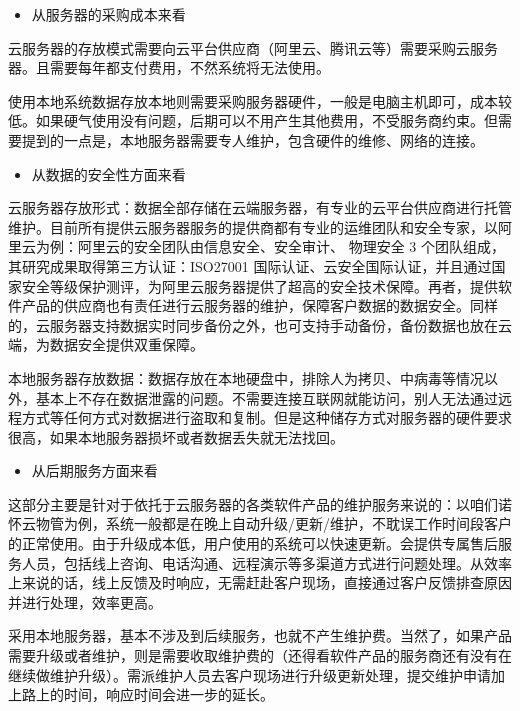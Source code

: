 \documentclass[UTF8,a4paper,AutoFakeBold,AutoFakeSlant]{ctexart}
\begin{document}
\begin{itemize}
  \item 从服务器的采购成本来看
\end{itemize}

云服务器的存放模式需要向云平台供应商（阿里云、腾讯云等）需要采购云服务器。且需要每年都支付费用，不然系统将无法使用。

使用本地系统数据存放本地则需要采购服务器硬件，一般是电脑主机即可，成本较低。如果硬气使用没有问题，后期可以不用产生其他费用，不受服务商约束。但需要提到的一点是，本地服务器需要专人维护，包含硬件的维修、网络的连接。

\begin{itemize}
  \item 从数据的安全性方面来看
\end{itemize}


云服务器存放形式：数据全部存储在云端服务器，有专业的云平台供应商进行托管维护。目前所有提供云服务器服务的提供商都有专业的运维团队和安全专家，以阿里云为例：阿里云的安全团队由信息安全、安全审计、 物理安全 3 个团队组成，其研究成果取得第三方认证：ISO27001 国际认证、云安全国际认证，并且通过国家安全等级保护测评，为阿里云服务器提供了超高的安全技术保障。再者，提供软件产品的供应商也有责任进行云服务器的维护，保障客户数据的数据安全。同样的，云服务器支持数据实时同步备份之外，也可支持手动备份，备份数据也放在云端，为数据安全提供双重保障。

本地服务器存放数据：数据存放在本地硬盘中，排除人为拷贝、中病毒等情况以外，基本上不存在数据泄露的问题。不需要连接互联网就能访问，别人无法通过远程方式等任何方式对数据进行盗取和复制。但是这种储存方式对服务器的硬件要求很高，如果本地服务器损坏或者数据丢失就无法找回。

\begin{itemize}
  \item 从后期服务方面来看
\end{itemize}

这部分主要是针对于依托于云服务器的各类软件产品的维护服务来说的：以咱们诺怀云物管为例，系统一般都是在晚上自动升级/更新/维护，不耽误工作时间段客户的正常使用。由于升级成本低，用户使用的系统可以快速更新。会提供专属售后服务人员，包括线上咨询、电话沟通、远程演示等多渠道方式进行问题处理。从效率上来说的话，线上反馈及时响应，无需赶赴客户现场，直接通过客户反馈排查原因并进行处理，效率更高。

采用本地服务器，基本不涉及到后续服务，也就不产生维护费。当然了，如果产品需要升级或者维护，则是需要收取维护费的（还得看软件产品的服务商还有没有在继续做维护升级）。需派维护人员去客户现场进行升级更新处理，提交维护申请加上路上的时间，响应时间会进一步的延长。
\end{document}
